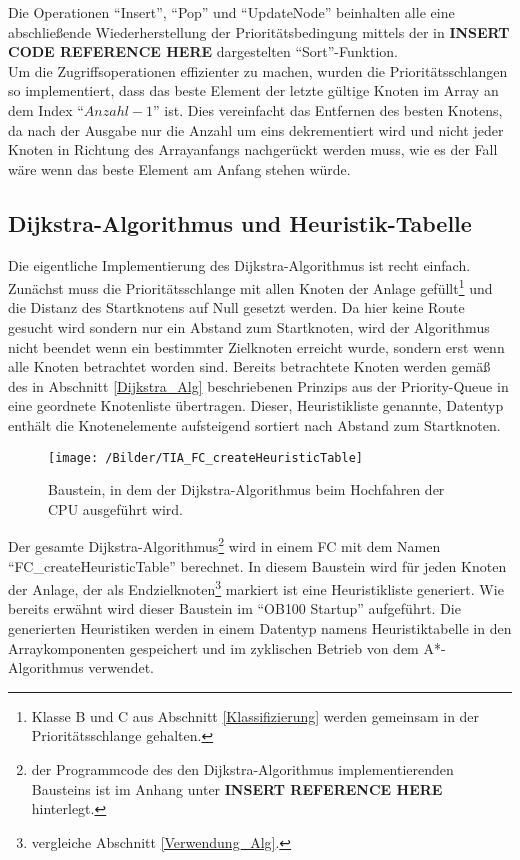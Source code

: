 			Die Operationen "`Insert"', "`Pop"' und "`UpdateNode"' beinhalten alle eine abschließende Wiederherstellung  der Prioritätsbedingung mittels der in \textbf{INSERT CODE REFERENCE HERE} dargestelten "`Sort"'-Funktion.\\
			Um die Zugriffsoperationen effizienter zu machen, wurden die Prioritätsschlangen so implementiert, dass das beste Element der letzte gültige Knoten im Array an dem Index "`$Anzahl - 1$"' ist. Dies vereinfacht das Entfernen des besten Knotens, da nach der Ausgabe nur die Anzahl um eins dekrementiert wird und nicht jeder Knoten in Richtung des Arrayanfangs nachgerückt werden muss, wie es der Fall wäre wenn das beste Element am Anfang stehen würde.
			
		\subsection{Dijkstra-Algorithmus und Heuristik-Tabelle}
			
			Die eigentliche Implementierung des Dijkstra-Algorithmus ist recht einfach. Zunächst muss die Prioritätsschlange mit allen Knoten der Anlage gefüllt\footnote{Klasse B und C aus Abschnitt \ref{Klassifizierung} werden gemeinsam in der Prioritätsschlange gehalten.} und die Distanz des Startknotens auf Null gesetzt werden. 
			Da hier keine Route gesucht wird sondern nur ein Abstand zum Startknoten, wird der Algorithmus nicht beendet wenn ein bestimmter Zielknoten erreicht wurde, sondern erst wenn alle Knoten betrachtet worden sind. Bereits betrachtete Knoten werden gemäß des in Abschnitt \ref{Dijkstra_Alg} beschriebenen Prinzips aus der Priority-Queue in eine geordnete Knotenliste übertragen. Dieser, Heuristikliste genannte, Datentyp enthält die Knotenelemente aufsteigend sortiert nach Abstand zum Startknoten.
			
			\begin{figure}[h]
				\centering
				\texttt{[image: /Bilder/TIA\_FC\_createHeuristicTable]}
				\vspace{0.2cm}
				\caption{Baustein, in dem der Dijkstra-Algorithmus beim Hochfahren der CPU ausgeführt wird.}
				
			\end{figure}
			Der gesamte Dijkstra-Algorithmus\footnote{der Programmcode des den Dijkstra-Algorithmus implementierenden Bausteins ist im Anhang unter \textbf{INSERT REFERENCE HERE} hinterlegt.} wird in einem \ac{FC} mit dem Namen "`FC\_createHeuristicTable"' berechnet. In diesem Baustein wird für jeden Knoten der Anlage, der als Endzielknoten\footnote{vergleiche Abschnitt \ref{Verwendung_Alg}.} markiert ist eine Heuristikliste generiert. Wie bereits erwähnt wird dieser Baustein im "`\ac{OB}100 Startup"' aufgeführt. Die generierten Heuristiken werden in einem Datentyp namens Heuristiktabelle in den Arraykomponenten gespeichert und im zyklischen Betrieb von dem A*-Algorithmus verwendet. 
		
